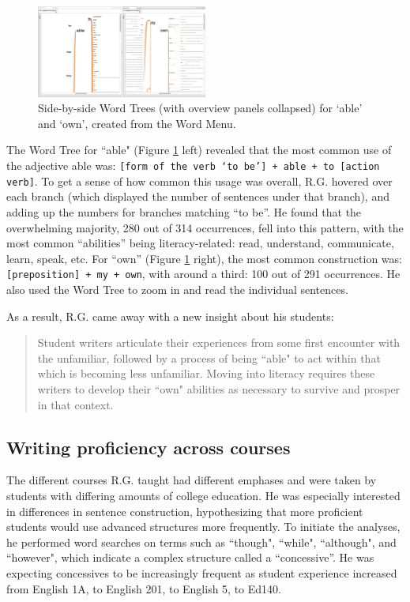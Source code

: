 \documentclass{sig-alternate}
\newcommand{\code}[1] {\texttt{#1}}
\begin{document}
\begin{figure}[h!]
\includegraphics[width=0.5\textwidth]{fig/rex/04.png}
\caption{ Side-by-side Word Trees (with overview panels collapsed) for `able' and `own', created from the Word Menu. \label{fig:rex04}}
\end{figure}

The Word Tree for ``able" (Figure \ref{fig:rex04} left) revealed that the most common use of the adjective able was: \code{[form of the verb `to be'] + able + to [action verb]}. To get a sense of how common this usage was overall, R.G. hovered over each branch (which displayed the number of sentences under that branch), and adding up the numbers for branches matching ``to be''. He found that the overwhelming majority, 280 out of 314 occurrences, fell into this pattern, with the most common ``abilities'' being literacy-related: read, understand, communicate, learn, speak, etc. For  ``own'' (Figure \ref{fig:rex04} right), the most common construction was: \code{[preposition] + my + own}, with around a third: 100 out of 291 occurrences.  He also used the Word Tree to zoom in and read the individual sentences.

As a result, R.G. came away with a new insight about his students:
\begin{quote}
Student writers articulate their experiences from some first encounter with the unfamiliar, followed by a process of being ``able" to act within that which is becoming less unfamiliar.  Moving into literacy requires these writers to develop their ``own" abilities as necessary to survive and prosper in that context.
\end{quote} 

\subsection{Writing proficiency across courses}
The different courses R.G. taught had different emphases and were taken by students with differing amounts of college education. He was especially interested in differences in sentence construction, hypothesizing that more proficient students would use advanced structures more frequently. To initiate the analyses, he performed word searches on terms such as ``though", ``while", ``although", and ``however", which indicate a complex structure called a ``concessive''. He was expecting concessives to be increasingly frequent as student experience increased from English 1A, to English 201, to English 5, to Ed140.
\end{document}
